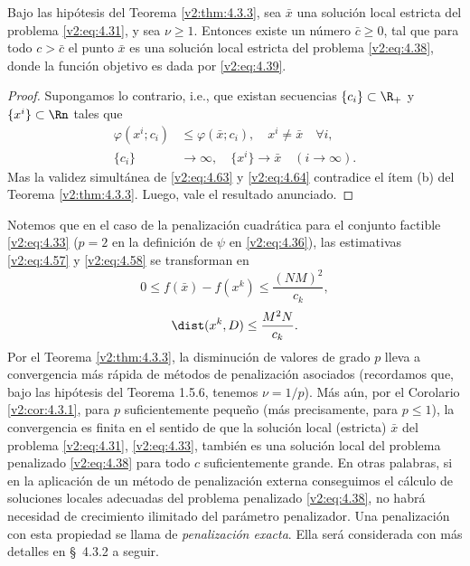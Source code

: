 \begin{corollary}\label{v2:cor:4.3.1}
    Bajo las hipótesis del Teorema \ref{v2:thm:4.3.3}, sea $\bar{x}$ una solución local estricta del problema \eqref{v2:eq:4.31}, y sea $\nu \ge 1$.
    Entonces existe un número $\bar{c} \ge 0$, tal que para todo $c > \bar{c}$ el punto $\bar{x}$ es una solución local estricta del problema \eqref{v2:eq:4.38}, donde la función objetivo es dada por \eqref{v2:eq:4.39}.
\end{corollary}

\begin{proof}
    Supongamos lo contrario, i.e., que existan secuencias $\{c_i\} \subset \R_+$ y $\{x^i\} \subset \Rn$ tales que
    \begin{align}
        \varphi(x^i; c_i) &\le \varphi(\bar{x}; c_i), \quad x^i \neq \bar{x} \quad \forall i, \label{v2:eq:4.63} \\
        \{c_i\} &\to \infty, \quad \{x^i\} \to \bar{x} \quad (i \to \infty). \label{v2:eq:4.64}
    \end{align}
    Mas la validez simultánea de \eqref{v2:eq:4.63} y \eqref{v2:eq:4.64} contradice el ítem (b) del Teorema \ref{v2:thm:4.3.3}. Luego, vale el resultado anunciado.
\end{proof}

Notemos que en el caso de la penalización cuadrática para el conjunto factible \eqref{v2:eq:4.33} ($p = 2$ en la definición de $\psi$ en \eqref{v2:eq:4.36}), las estimativas \eqref{v2:eq:4.57} y \eqref{v2:eq:4.58} se transforman en
\[
    0 \le f(\bar{x}) - f(x^k) \le \frac{(NM)^2}{c_k},
\]
\[
    \dist(x^k, D) \le \frac{M^2 N}{c_k}.
\]
Por el Teorema \ref{v2:thm:4.3.3}, la disminución de valores de grado $p$ lleva a convergencia más rápida de métodos de penalización asociados (recordamos que, bajo las hipótesis del Teorema 1.5.6, tenemos $\nu = 1/p$). Más aún, por el Corolario \ref{v2:cor:4.3.1}, para $p$ suficientemente pequeño (más precisamente, para $p \le 1$), la convergencia es finita en el sentido de que la solución local (estricta) $\bar{x}$ del problema \eqref{v2:eq:4.31}, \eqref{v2:eq:4.33}, también es una solución local del problema penalizado \eqref{v2:eq:4.38} para todo $c$ suficientemente grande. En otras palabras, si en la aplicación de un método de penalización externa conseguimos el cálculo de soluciones locales adecuadas del problema penalizado \eqref{v2:eq:4.38}, no habrá necesidad de crecimiento ilimitado del parámetro penalizador. Una penalización con esta propiedad se llama de \textit{penalización exacta}. Ella será considerada con más detalles en \S~4.3.2 a seguir.

